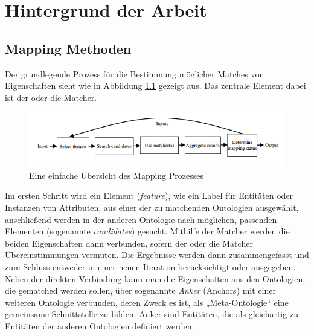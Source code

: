 %
\chapter{Hintergrund der Arbeit}
\label{chap:background}
	\section{Mapping Methoden}
	Der grundlegende Prozess für die Bestimmung möglicher Matches von Eigenschaften
	sieht wie in Abbildung \ref{fig1} gezeigt aus. Das zentrale Element dabei ist
	der oder die Matcher. \cite{Hoo14}
	
	\begin{figure}[ht]
	\centering
	\includegraphics[width=1.0\textwidth]{pics/simple-high-level-view-of-a-mapping-process.png}
	\caption{Eine einfache Übersicht des Mapping Prozesses \cite{Hoo14}}
	\label{fig1}
	\end{figure}
	
	Im ersten Schritt wird ein Element (\textit{feature}), wie ein Label für
	Entitäten oder Instanzen von Attributen, aus einer der zu matchenden Ontologien ausgewählt,
	anschließend werden in der anderen Ontologie nach möglichen, passenden
	Elementen (sogenannte \textit{candidates}) gesucht. Mithilfe der Matcher werden
	die beiden Eigenschaften dann verbunden, sofern der oder die Matcher Übereinstimmungen vermuten. Die Ergebnisse werden dann zusammengefasst und zum Schluss entweder in einer neuen Iteration berücksichtigt oder ausgegeben. \cite{Hoo14}\\
	Neben der direkten Verbindung kann man die Eigenschaften aus den Ontologien, die
	gematched werden sollen, über sogenannte \textit{Anker} (Anchors) mit einer
	weiteren Ontologie verbunden, deren Zweck es ist, als „Meta-Ontologie“ eine gemeinsame Schnittstelle zu bilden. Anker sind Entitäten, die als gleichartig zu Entitäten der anderen Ontologien definiert werden. \cite{Hoo14}
	
